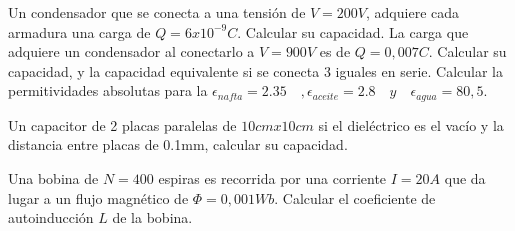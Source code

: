 \documentclass[./examen.tex]{subfiles}
\begin{document}
\begin{center}
\end{center}
\begin{questions}
    \question Un condensador que se conecta a una tensión de $V=200V$, adquiere cada armadura una carga de $Q=6x10^{-9}C$. Calcular su capacidad.
    \question La carga que adquiere un condensador al conectarlo a $V=900V$ es de $Q=0,007C$. Calcular su capacidad, y la capacidad equivalente si se conecta 3 iguales en serie.
       \question Calcular la permitividades absolutas para la $\epsilon_{nafta}=2.35 \quad, \epsilon_{aceite}=2.8\quad y \quad \epsilon_{agua}=80,5$.
   
    \question Un capacitor de 2 placas paralelas de $10cmx10cm$ si el dieléctrico es el vacío y la distancia entre placas de 0.1mm, calcular su capacidad.
    
    \question Una bobina de $N=400$ espiras es recorrida por una corriente $I=20A$ que da lugar a un flujo magnético de $\Phi=0,001Wb$. Calcular el coeficiente de autoinducción $L$ de la bobina.
    
\end{questions}


 
\end{document}

